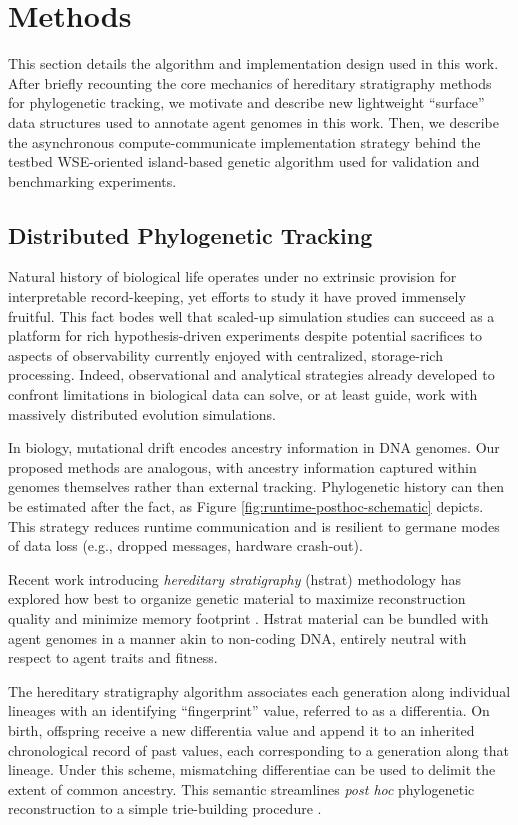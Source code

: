 \section{Methods} \label{sec:methods}

This section details the algorithm and implementation design used in this work.
After briefly recounting the core mechanics of hereditary stratigraphy methods for phylogenetic tracking, we motivate and describe new lightweight ``surface'' data structures used to annotate agent genomes in this work.
Then, we describe the asynchronous compute-communicate implementation strategy behind the testbed WSE-oriented island-based genetic algorithm used for validation and benchmarking experiments.

\subsection{Distributed Phylogenetic Tracking}

Natural history of biological life operates under no extrinsic provision for interpretable record-keeping, yet efforts to study it have proved immensely fruitful.
This fact bodes well that scaled-up simulation studies can succeed as a platform for rich hypothesis-driven experiments despite potential sacrifices to aspects of observability currently enjoyed with centralized, storage-rich processing.
Indeed, observational and analytical strategies already developed to confront limitations in biological data can solve, or at least guide, work with massively distributed evolution simulations.

In biology, mutational drift encodes ancestry information in DNA genomes.
Our proposed methods are analogous, with ancestry information captured within genomes themselves rather than external tracking.
Phylogenetic history can then be estimated after the fact, as Figure \ref{fig:runtime-posthoc-schematic} depicts.
This strategy reduces runtime communication and is resilient to germane modes of data loss (e.g., dropped messages, hardware crash-out).

Recent work introducing \textit{hereditary stratigraphy} (hstrat) methodology has explored how best to organize genetic material to maximize reconstruction quality and minimize memory footprint \citep{moreno2022hstrat, moreno2022hereditary}.
Hstrat material can be bundled with agent genomes in a manner akin to non-coding DNA, entirely neutral with respect to agent traits and fitness.

The hereditary stratigraphy algorithm associates each generation along individual lineages with an identifying ``fingerprint'' value, referred to as a differentia.
On birth, offspring receive a new differentia value and append it to an inherited chronological record of past values, each corresponding to a generation along that lineage.
Under this scheme, mismatching differentiae can be used to delimit the extent of common ancestry.
This semantic streamlines \textit{post hoc} phylogenetic reconstruction to a simple trie-building procedure
\citep{moreno2024analysis}.

